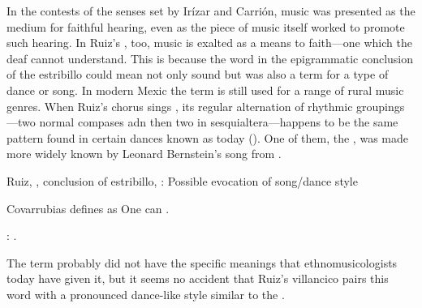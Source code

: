 In the contests of the senses set by Irízar and Carrión, music was presented as the medium for faithful hearing, even as the piece of music itself worked to promote such hearing.
In Ruiz's , too, music is exalted as a means to faith---one which the deaf cannot understand.
This is because the word  in the epigrammatic conclusion of the estribillo could mean not only sound but was also a term for a type of dance or song.
In modern Mexic the term is still used for a range of rural music genres.%
  \autocite[]{Grove}
When Ruiz's chorus sings , its regular alternation of rhythmic groupings---two normal compases adn then two in sesquialtera---happens to be the same pattern found in certain dances known as  today ().
One of them, the , was made more widely known by Leonard Bernstein's song  from .

\begin{exmusic}
\caption{Ruiz, , conclusion of estribillo, : Possible evocation of  song/dance style}
\label{exmusic:Ruiz-Sordos-son}
\end{exmusic}

Covarrubias defines  as 
One can .%
  \begin{Footnote}
  \autocite[]{Covarrubias:Tesoro}:
  .
  \end{Footnote}
The term probably did not have the specific meanings that ethnomusicologists today have given it, but it seems no accident that Ruiz's villancico pairs this word with a pronounced dance-like style similar to the .


